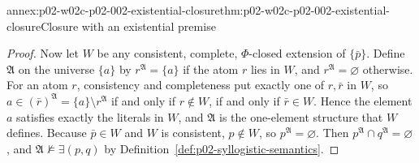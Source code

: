 \begin{annexitem}{annex:p02-w02c-p02-002-existential-closure}{thm:p02-w02c-p02-002-existential-closure}{Closure with an existential premise}
\begin{proof}
Now let \(W\) be any consistent, complete, \(\Phi\)-closed extension of
\(\{\bar p\}\). Define \(\mathfrak A\) on the universe \(\{a\}\) by
\(r^{\mathfrak A}=\{a\}\) if the atom \(r\) lies in \(W\), and
\(r^{\mathfrak A}=\varnothing\) otherwise. For an atom \(r\), consistency
and completeness put exactly one of \(r,\bar r\) in \(W\), so
\(a\in(\bar r)^{\mathfrak A}=\{a\}\setminus r^{\mathfrak A}\) if and only if
\(r\notin W\), if and only if \(\bar r\in W\). Hence the element \(a\)
satisfies exactly the literals in \(W\), and \(\mathfrak A\) is the
one-element structure that \(W\) defines. Because \(\bar p\in W\) and
\(W\) is consistent, \(p\notin W\), so \(p^{\mathfrak A}=\varnothing\).
Then \(p^{\mathfrak A}\cap q^{\mathfrak A}=\varnothing\), and
\(\mathfrak A\not\models\exists(p,q)\) by
Definition~\ref{def:p02-syllogistic-semantics}.
\end{proof}
\end{annexitem}
